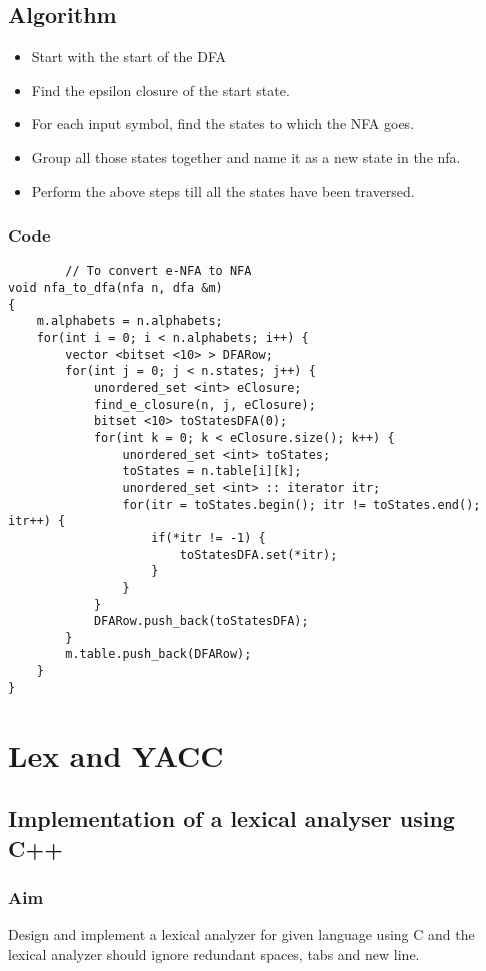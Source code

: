 \documentclass[a4paper, 12pt]{report}
\begin{document}
    \section{Algorithm}
    \begin{itemize}
        \item{Start with the start of the DFA}
        \item {Find the epsilon closure of the start state.}
        \item {For each input symbol, find the states to which the NFA goes.}
        \item {Group all those states together and name it as a new state in the nfa.}
        \item {Perform the above steps till all the states have been traversed.}
    \end{itemize}

    \subsection{Code} 
    \begin{verbatim}
        // To convert e-NFA to NFA
void nfa_to_dfa(nfa n, dfa &m)
{
    m.alphabets = n.alphabets;
    for(int i = 0; i < n.alphabets; i++) {
        vector <bitset <10> > DFARow;
        for(int j = 0; j < n.states; j++) {
            unordered_set <int> eClosure;
            find_e_closure(n, j, eClosure);
            bitset <10> toStatesDFA(0);
            for(int k = 0; k < eClosure.size(); k++) {
                unordered_set <int> toStates;
                toStates = n.table[i][k];
                unordered_set <int> :: iterator itr;
                for(itr = toStates.begin(); itr != toStates.end(); itr++) {
                    if(*itr != -1) {
                        toStatesDFA.set(*itr);
                    }
                }
            }
            DFARow.push_back(toStatesDFA);
        }
        m.table.push_back(DFARow);
    }
}
    \end{verbatim}

\chapter{Lex and YACC}
\section{Implementation of a lexical analyser using C++}
\subsection{Aim}
Design and implement a lexical analyzer for given language using C and the lexical
analyzer should ignore redundant spaces, tabs and new line.
\end{document}
